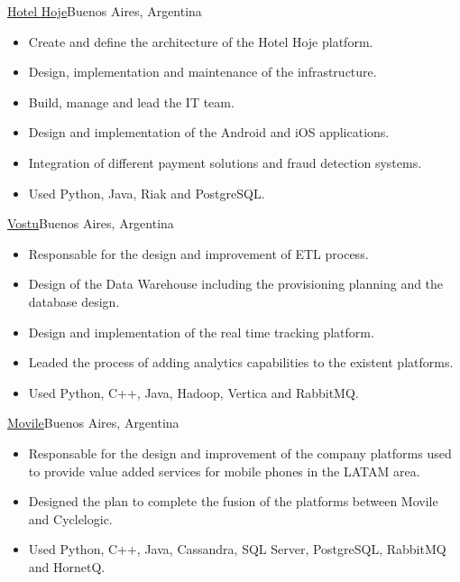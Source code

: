 \documentclass[a4paper,11pt]{moderncv}
\newcommand\weblink[2] {{\color{href} \href{#1}{#2}}}
\begin{document}
%
{\weblink{http://www.hotelhoje.com}{Hotel Hoje}}{Buenos Aires, Argentina}{}{%
\begin{itemize}
  \item Create and define the architecture of the Hotel Hoje platform.
  \item Design, implementation and maintenance of the infrastructure.
  \item Build, manage and lead the IT team.
  \item Design and implementation of the Android and iOS applications.
  \item Integration of different payment solutions and fraud detection 
    systems.
  \item Used Python, Java, Riak and PostgreSQL.
\end{itemize}
}
%
{\weblink{http://www.vostu.com}{Vostu}}{Buenos Aires, Argentina}{}{%
\begin{itemize}
  \item Responsable for the design and improvement of ETL process.
  \item Design of the Data Warehouse including the provisioning planning and
  the database design.
  \item Design and implementation of the real time tracking platform.
  \item Leaded the process of adding analytics capabilities to the existent
  platforms.
  \item Used Python, C++, Java, Hadoop, Vertica and RabbitMQ.
\end{itemize}
}
%
{\weblink{http://www.movile.com}{Movile}}{Buenos Aires, Argentina}{}{%
\begin{itemize}
  \item Responsable for the design and improvement of the company platforms
  used to provide value added services for mobile phones in the LATAM area.
  \item Designed the plan to complete the fusion of the platforms between
  Movile and Cyclelogic.
  \item Used Python, C++, Java, Cassandra, SQL Server, PostgreSQL, RabbitMQ and
  HornetQ.
\end{itemize}
}
%
\end{document}
